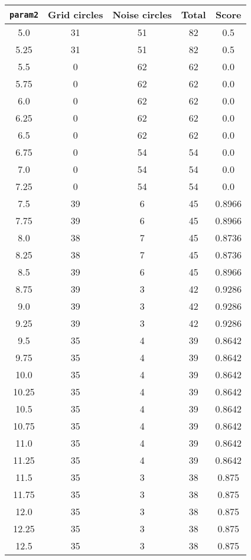 \documentclass[letterpaper, 12pt]{article}
\begin{document}
\begin{longtable}{|c|c|c|c|c|}
\hline
\textbf{\texttt{param2}} & \textbf{Grid circles} & \textbf{Noise circles} & \textbf{Total} & \textbf{Score} \\
\hline
5.0 & 31 & 51 & 82 & 0.5 \\
\hline
5.25 & 31 & 51 & 82 & 0.5 \\
\hline
5.5 & 0 & 62 & 62 & 0.0 \\
\hline
5.75 & 0 & 62 & 62 & 0.0 \\
\hline
6.0 & 0 & 62 & 62 & 0.0 \\
\hline
6.25 & 0 & 62 & 62 & 0.0 \\
\hline
6.5 & 0 & 62 & 62 & 0.0 \\
\hline
6.75 & 0 & 54 & 54 & 0.0 \\
\hline
7.0 & 0 & 54 & 54 & 0.0 \\
\hline
7.25 & 0 & 54 & 54 & 0.0 \\
\hline
7.5 & 39 & 6 & 45 & 0.8966 \\
\hline
7.75 & 39 & 6 & 45 & 0.8966 \\
\hline
8.0 & 38 & 7 & 45 & 0.8736 \\
\hline
8.25 & 38 & 7 & 45 & 0.8736 \\
\hline
8.5 & 39 & 6 & 45 & 0.8966 \\
\hline
8.75 & 39 & 3 & 42 & 0.9286 \\
\hline
9.0 & 39 & 3 & 42 & 0.9286 \\
\hline
9.25 & 39 & 3 & 42 & 0.9286 \\
\hline
9.5 & 35 & 4 & 39 & 0.8642 \\
\hline
9.75 & 35 & 4 & 39 & 0.8642 \\
\hline
10.0 & 35 & 4 & 39 & 0.8642 \\
\hline
10.25 & 35 & 4 & 39 & 0.8642 \\
\hline
10.5 & 35 & 4 & 39 & 0.8642 \\
\hline
10.75 & 35 & 4 & 39 & 0.8642 \\
\hline
11.0 & 35 & 4 & 39 & 0.8642 \\
\hline
11.25 & 35 & 4 & 39 & 0.8642 \\
\hline
11.5 & 35 & 3 & 38 & 0.875 \\
\hline
11.75 & 35 & 3 & 38 & 0.875 \\
\hline
12.0 & 35 & 3 & 38 & 0.875 \\
\hline
12.25 & 35 & 3 & 38 & 0.875 \\
\hline
12.5 & 35 & 3 & 38 & 0.875 \\

\end{longtable}
\end{document}
